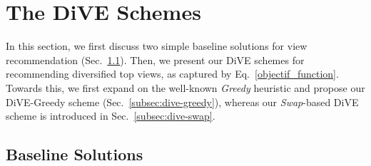 

\section{The D\texorpdfstring{\MakeLowercase{i}}{}VE Schemes}
\label{sec:dive_schemes}


In this section, we first discuss two simple baseline solutions for view recommendation (Sec.~\ref{subsec:baseline}). 
%
Then, we present our DiVE schemes for recommending diversified top views, as captured by Eq.~\ref{objectif_function}. 
%
Towards this, we first expand on the well-known {\em Greedy} heuristic and propose our DiVE-Greedy scheme (Sec.~\ref{subsec:dive-greedy}), whereas our {\em Swap}-based DiVE scheme is introduced in Sec.~\ref{subsec:dive-swap}.
%



\subsection{Baseline Solutions}\label{subsec:baseline}

